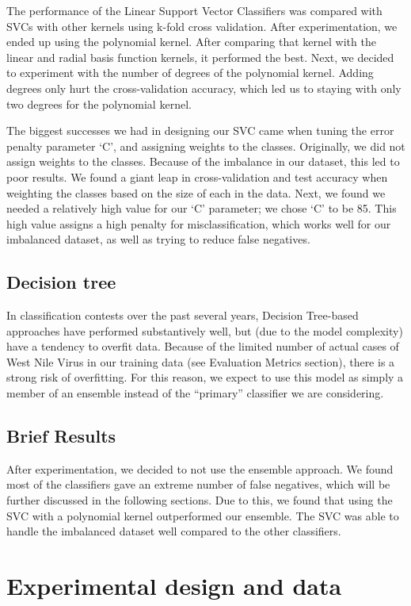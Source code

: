 \documentclass{article} %
\begin{document}
The performance of the Linear Support Vector Classifiers was compared with SVCs with other kernels using k-fold cross validation.  After experimentation, we ended up using the polynomial kernel.  After comparing that kernel with the linear and radial basis function kernels, it performed the best.  Next, we decided to experiment with the number of degrees of the polynomial kernel.  Adding degrees only hurt the cross-validation accuracy, which led us to staying with only two degrees for the polynomial kernel.

The biggest successes we had in designing our SVC came when tuning the error penalty parameter ‘C’, and assigning weights to the classes.  Originally, we did not assign weights to the classes.  Because of the imbalance in our dataset, this led to poor results.  We found a giant leap in cross-validation and test accuracy when weighting the classes based on the size of each in the data.  Next, we found we needed a relatively high value for our ‘C’ parameter; we chose ‘C’ to be 85.  This high value assigns a high penalty for misclassification, which works well for our imbalanced dataset, as well as trying to reduce false negatives.  

\subsection{Decision tree}
In classification contests over the past several years, Decision Tree-based approaches have performed substantively well, but (due to the model complexity) have a tendency to overfit data. Because of the limited number of actual cases of West Nile Virus in our training data (see Evaluation Metrics section), there is a strong risk of overfitting. For this reason, we expect to use this model as simply a member of an ensemble instead of the “primary” classifier we are considering. 

\subsection{Brief Results}
After experimentation, we decided to not use the ensemble approach.  We found most of the classifiers gave an extreme number of false negatives, which will be further discussed in the following sections.  Due to this, we found that using the SVC with a polynomial kernel outperformed our ensemble.  The SVC was able to handle the imbalanced dataset well compared to the other classifiers.  

\section{Experimental design and data}
\end{document}
